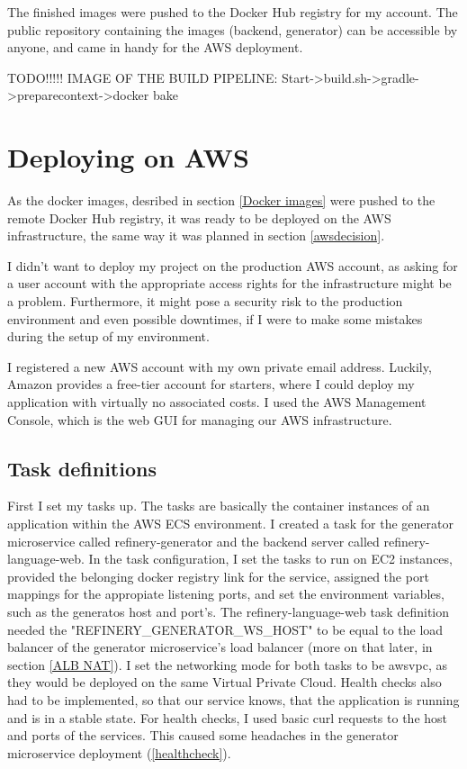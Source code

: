 			The finished images were pushed to the Docker Hub registry for my account. The public repository containing the images (backend,
			generator) can be accessible by anyone, and came in handy for the AWS deployment.

		TODO!!!!! IMAGE OF THE BUILD PIPELINE: Start->build.sh->gradle->preparecontext->docker bake

	\section{Deploying on AWS} \label{awsdeploy}
		As the docker images, desribed in section \ref{Docker images} were pushed to the remote Docker Hub registry, it was ready to be deployed on the AWS infrastructure, the 
		same way it was planned in section \ref{awsdecision}.

		I didn't want to deploy my project on the production AWS account, as asking for a user account with the appropriate access rights for the
		infrastructure might be a problem. Furthermore, it might pose a security risk to the production environment and even possible downtimes, if I
		were to make some mistakes during the setup of my environment.

		I registered a new AWS account with my own private email address. Luckily, Amazon provides a free-tier account for starters, where 
		I could deploy my application with virtually no associated costs. I used the AWS Management Console, which is the web GUI for 
		managing our AWS infrastructure.

		\subsection{Task definitions} \label{awstasks}
			First I set my tasks up. The tasks are basically the container instances of an application within the AWS ECS environment. 
			I created a task
			for the generator microservice called refinery-generator and the backend server called refinery-language-web.
			In the task configuration, I set the tasks to run on EC2 instances, provided the belonging docker registry link for the service,
			assigned the port mappings for the appropiate listening ports, and set the environment variables, 
			such as the generatos host and port's. The refinery-language-web task definition needed the "REFINERY\_GENERATOR\_WS\_HOST" to 
			be equal to the load balancer of the generator microservice's load balancer (more on that later, in section \ref{ALB NAT}).
			I set the networking mode for both tasks to be awsvpc, as they would be deployed on the same Virtual Private Cloud.
			Health checks also had to be implemented, so that our service knows, that the application is running and is in a stable state.
			For health checks, I used basic curl requests to the host and ports of the services. This caused some headaches in the 
			generator microservice deployment (\ref{healthcheck}).

